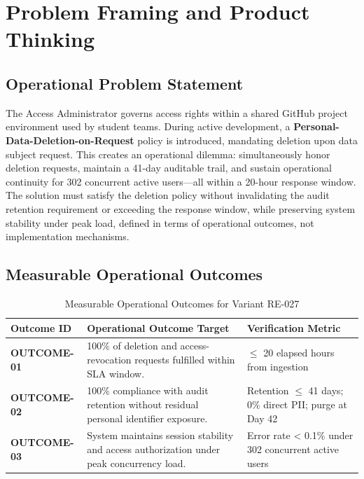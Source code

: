 \documentclass[10pt,a4paper]{article}
\begin{document}
\section{Problem Framing and Product Thinking}

\subsection{Operational Problem Statement}

The Access Administrator governs access rights within a shared GitHub project environment used by student teams. During active development, a \textbf{Personal-Data-Deletion-on-Request} policy is introduced, mandating deletion upon data subject request. This creates an operational dilemma: simultaneously honor deletion requests, maintain a 41-day auditable trail, and sustain operational continuity for 302 concurrent active users---all within a 20-hour response window. The solution must satisfy the deletion policy without invalidating the audit retention requirement or exceeding the response window, while preserving system stability under peak load, defined in terms of operational outcomes, not implementation mechanisms.

\subsection{Measurable Operational Outcomes}

\begin{table}[htbp]
\centering
\scriptsize
\begin{tabularx}{\textwidth}{|l|X|l|}
\hline
\textbf{Outcome ID} & \textbf{Operational Outcome Target} & \textbf{Verification Metric} \\
\hline
\textbf{OUTCOME-01} & 100\% of deletion and access-revocation requests fulfilled within SLA window. & $\leq$ 20 elapsed hours from ingestion \\
\hline
\textbf{OUTCOME-02} & 100\% compliance with audit retention without residual personal identifier exposure. & Retention $\leq$ 41 days; 0\% direct PII; purge at Day 42 \\
\hline
\textbf{OUTCOME-03} & System maintains session stability and access authorization under peak concurrency load. & Error rate < 0.1\% under 302 concurrent active users \\
\hline
\end{tabularx}
\caption{Measurable Operational Outcomes for Variant RE-027}
\label{tab:outcomes}
\end{table}
\end{document}
